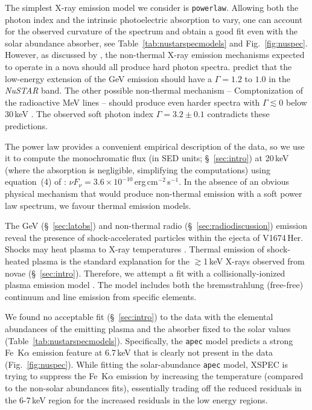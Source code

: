 \documentclass[a4paper,fleqn,usenatbib]{mnras}
\newcommand{\nova}{V1674\,Her}
\begin{document}
The simplest X-ray emission model we consider is \texttt{powerlaw}.
Allowing both the photon index and the intrinsic photoelectric absorption to
vary, one can account for the observed curvature of the spectrum and obtain 
a good fit even with the solar abundance absorber, see Table~\ref{tab:nustarspecmodels}
and Fig.~\ref{fig:nuspec}. 
%
However, as discussed by \cite{2022MNRAS.514.2239S}, 
the non-thermal X-ray emission mechanisms expected to operate in a nova 
should all produce hard photon spectra. 
%
\cite{2018ApJ...852...62V} predict that the low-energy extension of the GeV emission 
should have a $\Gamma = 1.2$ to $1.0$ in the {\em NuSTAR} band.
The other possible non-thermal mechanism -- Comptonization of the radioactive MeV lines 
-- should produce even harder spectra with $\Gamma \lesssim 0$ below 30\,keV \citep[see fig.~1--4 of][]{1998MNRAS.296..913G}. 
%
The observed soft photon index $\Gamma = 3.2 \pm 0.1$ contradicts these predictions.

The power law provides a convenient empirical description of the data, so 
we use it to compute the monochromatic flux 
(in SED units; \S~\ref{sec:intro}) 
at 20\,keV 
(where the absorption is negligible, simplifying the computations) using equation~(4) of \cite{2022MNRAS.514.2239S}: 
$\nu F_\nu = 3.6 \times 10^{-10}$\,erg\,cm$^{-2}$\,s$^{-1}$. 
%
In the absence of an obvious physical mechanism that would produce non-thermal emission 
with a soft power law spectrum, we favour thermal emission models.

The GeV (\S~\ref{sec:latobs}) and non-thermal radio (\S~\ref{sec:radiodiscussion})   
emission reveal the presence of shock-accelerated particles within the ejecta of \nova{}. 
Shocks may heat plasma to X-ray temperatures \citep[e.g.][]{1967pswh.book.....Z,1997pism.book.....D}. 
Thermal emission of shock-heated plasma is the standard explanation for the $\gtrsim$1\,keV 
X-rays observed from novae (\S~\ref{sec:intro}). 
Therefore, we attempt a fit with a collisionally-ionized plasma emission model \citep[\texttt{vapec;}][]{2005AIPC..774..405B}. 
The model includes both the bremsstrahlung (free-free) continuum and line emission from specific elements.

We found no acceptable fit (\S~\ref{sec:intro}) to the data with the elemental abundances of the emitting plasma and 
the absorber fixed to the solar values
 (Table~\ref{tab:nustarspecmodels}).
%
Specifically, the \texttt{apec} model predicts a strong Fe~K$\alpha$ emission feature at 6.7\,keV 
that is clearly not present in the data (Fig.~\ref{fig:nuspec}). 
%
While fitting the solar-abundance \texttt{apec} model, 
\textsc{XSPEC} is trying to suppress the Fe~K$\alpha$ emission by increasing 
the temperature (compared to the non-solar abundances fits), essentially
trading off the reduced residuals in the 6-7\,keV region for the increased
residuals in the low energy regions.
\end{document}
